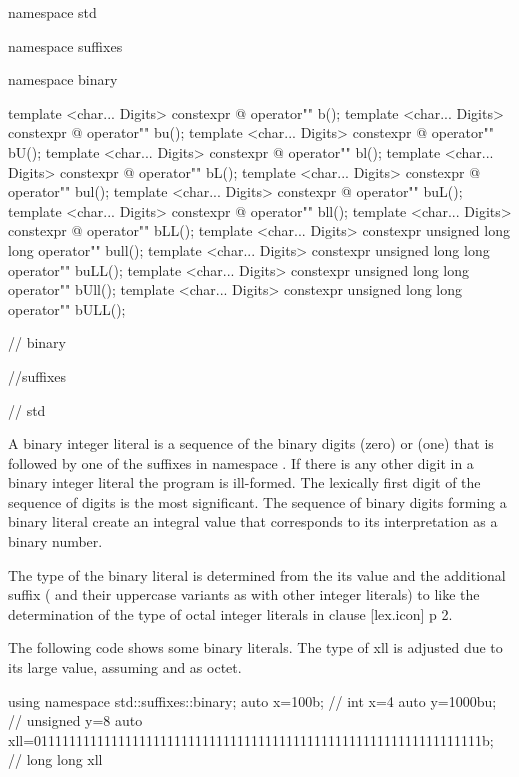 \documentclass[ebook,11pt,article]{memoir}
\begin{document}
\begin{codeblock}
namespace std{
namespace suffixes{
namespace binary{

template <char... Digits>
constexpr @\seebelow@ 
operator"" b();
template <char... Digits>
constexpr @\seebelow@ 
operator"" bu();
template <char... Digits>
constexpr @\seebelow@ 
operator"" bU();
template <char... Digits>
constexpr @\seebelow@ 
operator"" bl();
template <char... Digits>
constexpr @\seebelow@ 
operator"" bL();
template <char... Digits>
constexpr @\seebelow@ 
operator"" bul();
template <char... Digits>
constexpr @\seebelow@ 
operator"" buL();
template <char... Digits>
constexpr @\seebelow@ 
operator"" bll();
template <char... Digits>
constexpr @\seebelow@ 
operator"" bLL();
template <char... Digits>
constexpr unsigned long long
operator"" bull();
template <char... Digits>
constexpr unsigned long long
operator"" buLL();
template <char... Digits>
constexpr unsigned long long
operator"" bUll();
template <char... Digits>
constexpr unsigned long long
operator"" bULL();
} // binary
} //suffixes
} // std
\end{codeblock}

\pnum
A binary integer literal is a sequence of the binary digits  (zero) or  (one) that is followed by one of the suffixes in namespace . If there is any other digit in a binary integer literal the program is ill-formed. The lexically first digit of the sequence of digits is the most significant. The sequence of binary digits forming a binary literal create an integral value that corresponds to its interpretation as a binary number.

\pnum
The type of the binary literal is determined from the its value and the additional suffix ( and their uppercase variants as with other integer literals) to  like the determination of the type of octal integer literals in clause [lex.icon] p 2.

\pnum
\enterexample 
The following code shows some binary literals. The type of xll is adjusted due to its large value, assuming  and  as octet.
\begin{codeblock}
{
    using namespace std::suffixes::binary;
    auto x=100b; // int x=4
    auto y=1000bu; // unsigned y=8
    auto xll=0111111111111111111111111111111111111111111111111111111111111111b;
         // long long xll
}
\end{codeblock}
\exitexample
\end{document}
